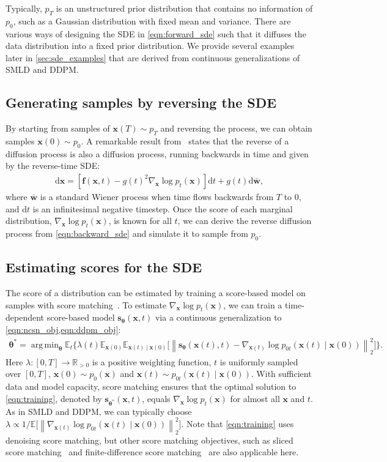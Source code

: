 \documentclass{article} \usepackage{iclr2021_conference,times}
\newcommand{\mbb}[1]{\mathbb{#1}}
\newcommand{\ud}{\mathrm{d}}
\newcommand{\norm}[1]{\left\lVert#1\right\rVert}
\DeclareMathOperator*{\argmin}{arg\,min}
\newcommand{\bfx}{\mathbf{x}}
\newcommand{\bfw}{\mathbf{w}}
\newcommand{\bff}{\mathbf{f}}
\newcommand{\bftheta}{{\boldsymbol{\theta}}}
\newcommand{\bfs}{\mathbf{s}}
\begin{document}
Typically, $p_T$ is an unstructured prior distribution that contains no information of $p_0$, such as a Gaussian distribution with fixed mean and variance. There are various ways of designing the SDE in \cref{eqn:forward_sde} such that it diffuses the data distribution into a fixed prior distribution. We provide several examples later in \cref{sec:sde_examples} that are derived from continuous generalizations of SMLD and DDPM.

\subsection{Generating samples by reversing the SDE}\label{sec:sde_reverse}
By starting from samples of $\bfx(T) \sim p_T$ and reversing the process, we can obtain samples $\bfx(0)\sim p_0$. A remarkable result from~\citet{Anderson1982-ny} states that the reverse of a diffusion process is also a diffusion process, running backwards in time and given by the reverse-time SDE:
\begin{align}
    \ud \bfx = [\bff(\bfx, t) - g(t)^2  \nabla_{\bfx}  \log p_t(\bfx)] \ud t + g(t) \ud \bar{\bfw},\label{eqn:backward_sde}
\end{align}
where $\bar{\bfw}$ is a standard Wiener process
when time flows backwards from $T$ to $0$, and $\ud t$ is an infinitesimal negative timestep. Once the score of each marginal distribution, $\nabla_\bfx \log p_t(\bfx)$, is known for all $t$, we can derive the reverse diffusion process from \cref{eqn:backward_sde} and simulate it to sample from $p_0$.


\subsection{Estimating scores for the SDE}\label{sec:training}
The score of a distribution can be estimated by training a score-based model on samples with score matching~\citep{hyvarinen2005estimation,song2019sliced}. To estimate $\nabla_\bfx \log p_t(\bfx)$, we can train a time-dependent score-based model $\bfs_\bftheta(\bfx, t)$ via a continuous generalization to \cref{eqn:ncsn_obj,eqn:ddpm_obj}:
\begin{align}
   \bftheta^* = \argmin_\bftheta 
   \mbb{E}_{t}\Big\{\lambda(t) \mbb{E}_{\bfx(0)}\mbb{E}_{\bfx(t) \mid \bfx(0) }
   \big[\norm{\bfs_\bftheta(\bfx(t), t) - \nabla_{\bfx(t)}\log p_{0t}(\bfx(t) \mid \bfx(0))}_2^2 \big]\Big\}. \label{eqn:training}
\end{align}
Here $\lambda: [0, T] \to \mbb{R}_{>0}$ is a positive weighting function, $t$ is uniformly sampled over $[0, T]$, $\bfx(0) \sim p_0(\bfx)$ and $\bfx(t) \sim p_{0t}(\bfx(t) \mid \bfx(0))$. With sufficient data and model capacity, score matching ensures that the optimal solution to \cref{eqn:training}, denoted by $\bfs_{\bftheta^\ast}(\bfx, t)$, equals $\nabla_\bfx \log p_t(\bfx)$ for almost all $\bfx$ and $t$. As in SMLD and DDPM, we can typically choose $\lambda \propto 1/{\mbb{E}\big[\norm{\nabla_{\bfx(t)}\log p_{0t}(\bfx(t) \mid \bfx(0))}_2^2\big]}$. Note that \cref{eqn:training} uses denoising score matching, but other score matching objectives, such as sliced score matching~\citep{song2019sliced} and finite-difference score matching~\citep{pang2020efficient} are also applicable here. 
\end{document}
